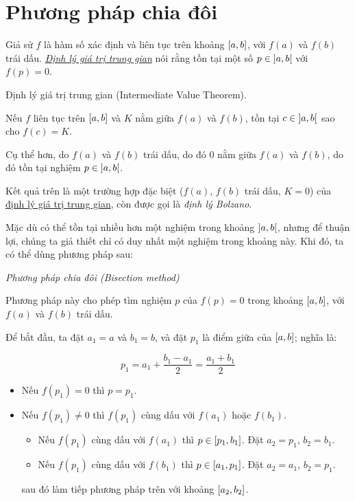\documentclass[../../Lectures.tex]{subfiles}
\begin{document}
\section{Phương pháp chia đôi}

Giả sử \(f\) là hàm số xác định và liên tục trên khoảng \(\interval{a}{b}\), với
\(f(a)\) và \(f(b)\) trái dấu.
\emph{\hyperref[thm:intermediate_value_theorem]{Định lý giá trị trung gian}} nói
rằng tồn tại một số \(p \in \interval[open]{a}{b}\) với \(f(p) = 0\).

\begin{theorem}\label{thm:intermediate_value_theorem}
    Định lý giá trị trung gian (Intermediate Value Theorem).

    Nếu \(f\) liên tục trên \(\interval{a}{b}\) và \(K\) nằm giữa \(f(a)\) và
    \(f(b)\), tồn tại \(c \in \interval[open]{a}{b}\) sao cho \(f(c) = K\).
\end{theorem}

Cụ thể hơn, do \(f(a)\) và \(f(b)\) trái dấu, do đó \(0\) nằm giữa \(f(a)\) và
\(f(b)\), do đó tồn tại nghiệm \(p \in \interval[open]{a}{b}\).

Kết quả trên là một trường hợp đặc biệt (\(f(a)\), \(f(b)\) trái dấu, \(K = 0\))
của \hyperref[thm:intermediate_value_theorem]{định lý giá trị trung gian}, còn
được gọi là \emph{định lý Bolzano}.

Mặc dù có thể tồn tại nhiều hơn một nghiệm trong khoảng
\(\interval[open]{a}{b}\), nhưng để thuận lợi, chúng ta giả thiết chỉ có duy
nhất một nghiệm trong khoảng này. Khi đó, ta có thể dùng phương pháp sau:

\begin{method}\label{method:bisection}
    \emph{Phương pháp chia đôi (Bisection method)}

    Phương pháp này cho phép tìm nghiệm \(p\) của \(f(p) = 0\) trong khoảng
    \(\interval{a}{b}\), với \(f(a)\) và \(f(b)\) trái dấu.

    Để bắt đầu, ta đặt \(a_1 = a\) và \(b_1 = b\), và đặt \(p_1\) là điểm giữa
    của \(\interval{a}{b}\); nghĩa là:

    \[p_1 = a_1 + \frac{b_1 - a_1}{2} = \frac{a_1 + b_1}{2}\]

    \begin{itemize}
        \item Nếu \(f(p_1) = 0\) thì \(p = p_1\).
        \item Nếu \(f(p_1) \neq 0\) thì \(f(p_1)\) cùng dấu với \(f(a_1)\) hoặc
            \(f(b_1)\).
            \begin{itemize}
                \item Nếu \(f(p_1)\) cùng dấu với \(f(a_1)\) thì \(p \in
                    \interval{p_1}{b_1}\). Đặt \(a_2 = p_1\), \(b_2 = b_1\).
                \item Nếu \(f(p_1)\) cùng dấu với \(f(b_1)\) thì \(p \in
                    \interval{a_1}{p_1}\). Đặt \(a_2 = a_1\), \(b_2 = p_1\).
            \end{itemize}
            sau đó làm tiếp phương pháp trên với khoảng \(\interval{a_2}{b_2}\).
    \end{itemize}
\end{method}
\end{document}
